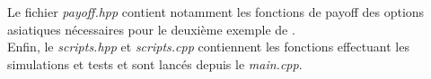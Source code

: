 \documentclass[12pt,a4paper]{report}
\newcommand{\source}[1]{\emph{#1}}
\begin{document}
Le fichier \source{payoff.hpp} contient notamment les fonctions de payoff des options asiatiques nécessaires pour le deuxième exemple de \cite{EJ08}.\\

Enfin, le \source{scripts.hpp} et \source{scripts.cpp} contiennent les fonctions effectuant les simulations et tests et sont lancés depuis le \source{main.cpp}.




{}

\end{document}
